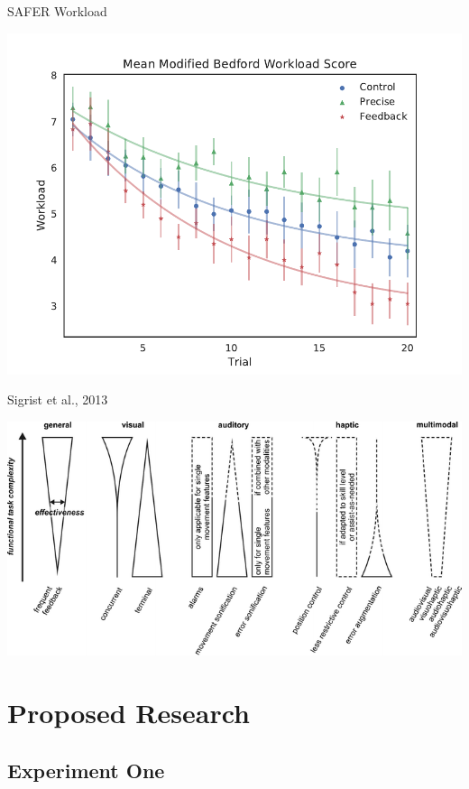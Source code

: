 \documentclass[10pt]{beamer}
\begin{document}
\begin{frame}[fragile]{SAFER Workload}
  \begin{center}
    \includegraphics[width=\textwidth]{../img/Group_Workload_fit_30.pdf}
  \end{center}
\end{frame}

\begin{frame}[fragile]{Sigrist et al., 2013~\cite{Sigrist2013}}
  \begin{center}
    \includegraphics[width=\textwidth]{../img/sigrist.png}
  \end{center}
\end{frame}

\section{Proposed Research}

\subsection{Experiment One}
\end{document}
